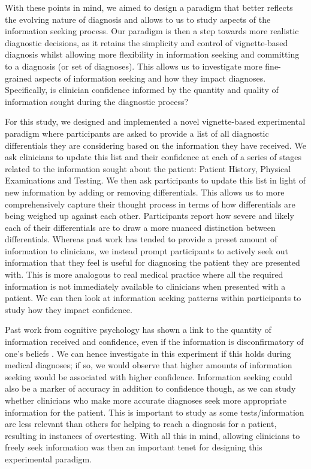 \documentclass[a4paper, nobind]{templates/ociamthesis}
\begin{document}
\hfill\break
With these points in mind, we aimed to design a paradigm that better reflects the evolving nature of diagnosis and allows to us to study aspects of the information seeking process. Our paradigm is then a step towards more realistic diagnostic decisions, as it retains the simplicity and control of vignette-based diagnosis whilst allowing more flexibility in information seeking and committing to a diagnosis (or set of diagnoses). This allows us to investigate more fine-grained aspects of information seeking and how they impact diagnoses. Specifically, is clinician confidence informed by the quantity and quality of information sought during the diagnostic process?

\hfill\break
For this study, we designed and implemented a novel vignette-based experimental paradigm where participants are asked to provide a list of all diagnostic differentials they are considering based on the information they have received. We ask clinicians to update this list and their confidence at each of a series of stages related to the information sought about the patient: Patient History, Physical Examinations and Testing. We then ask participants to update this list in light of new information by adding or removing differentials. This allows us to more comprehensively capture their thought process in terms of how differentials are being weighed up against each other. Participants report how severe and likely each of their differentials are to draw a more nuanced distinction between differentials. Whereas past work has tended to provide a preset amount of information to clinicians, we instead prompt participants to actively seek out information that they feel is useful for diagnosing the patient they are presented with. This is more analogous to real medical practice where all the required information is not immediately available to clinicians when presented with a patient. We can then look at information seeking patterns within participants to study how they impact confidence.

\hfill\break
Past work from cognitive psychology has shown a link to the quantity of information received and confidence, even if the information is disconfirmatory of one's beliefs \autocite{ko_divergent_2022}. We can hence investigate in this experiment if this holds during medical diagnoses; if so, we would observe that higher amounts of information seeking would be associated with higher confidence. Information seeking could also be a marker of accuracy in addition to confidence though, as we can study whether clinicians who make more accurate diagnoses seek more appropriate information for the patient. This is important to study as some tests/information are less relevant than others for helping to reach a diagnosis for a patient, resulting in instances of overtesting. With all this in mind, allowing clinicians to freely seek information was then an important tenet for designing this experimental paradigm.
\end{document}
